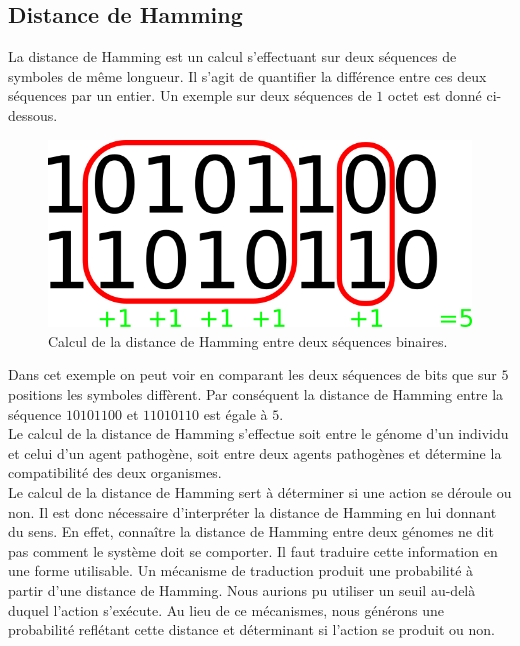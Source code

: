 \subsection{Distance de Hamming}

La distance de Hamming est un calcul s'effectuant sur deux séquences de symboles de même longueur. Il s'agit de quantifier la différence entre ces deux séquences par un entier. Un exemple sur deux séquences de $1$ octet est donné ci-dessous.

\begin{figure}[h]
	\centering
	\captionsetup{justification=centering}
	\includegraphics[scale=1]{Images/hamming.png}
	\caption[Calcul de la distance de Hamming]{Calcul de la distance de Hamming entre deux séquences binaires.}
\end{figure}

Dans cet exemple on peut voir en comparant les deux séquences de bits que sur $5$ positions les symboles diffèrent. Par conséquent la distance de Hamming entre la séquence $10101100$ et $11010110$ est égale à $5$.\\

Le calcul de la distance de Hamming s'effectue soit entre le génome d'un individu et celui d'un agent pathogène, soit entre deux agents pathogènes et détermine la compatibilité des deux organismes.\\

Le calcul de la distance de Hamming sert à déterminer si une action se déroule ou non. Il est donc nécessaire d'interpréter la distance de Hamming en lui donnant du sens. En effet, connaître la distance de Hamming entre deux génomes ne dit pas comment le système doit se comporter. Il faut traduire cette information en une forme utilisable. Un mécanisme de traduction produit une probabilité à partir d'une distance de Hamming. Nous aurions pu utiliser un seuil au-delà duquel l'action s'exécute. Au lieu de ce mécanismes, nous générons une probabilité reflétant cette distance et déterminant si l'action se produit ou non.\\

